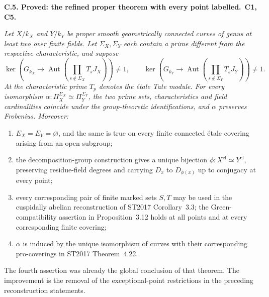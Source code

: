\documentclass[11pt,a4paper]{article}
\newcommand{\cl}{\mathrm{cl}}
\newcommand{\Aut}{\operatorname{Aut}}
\newenvironment{claim}[3]{\par\medskip\noindent\hypertarget{#1}{\textbf{#1. #2.}}\ \textbf{#3.}\par\nopagebreak\smallskip\begingroup\itshape}{\endgroup\par\smallskip}
\begin{document}
\begin{claim}{C.5}{Proved: the refined proper theorem with every point labelled}{C1, C5}
Let $X/k_X$ and $Y/k_Y$ be proper smooth geometrically connected
curves of genus at least two over finite fields. Let $\Sigma_X,
\Sigma_Y$ each contain a prime different from the respective
characteristic, and suppose
\[
 \ker\!\left(G_{k_X}\longrightarrow
       \Aut\!\left(\prod_{s\notin\Sigma_X}T_sJ_X\right)\right)
 \ne1,
 \qquad
 \ker\!\left(G_{k_Y}\longrightarrow
       \Aut\!\left(\prod_{s\notin\Sigma_Y}T_sJ_Y\right)\right)
 \ne1.
\]
At the characteristic prime $T_p$ denotes the \'etale Tate module.
For every isomorphism $\alpha:\Pi_X^{\Sigma_X}\simeq
\Pi_Y^{\Sigma_Y}$, the two prime sets, characteristics and field
cardinalities coincide under the group-theoretic identifications,
and $\alpha$ preserves Frobenius. Moreover:
\begin{enumerate}
\item $E_X=E_Y=\varnothing$, and the same is true on every finite
connected \'etale covering arising from an open subgroup;
\item the decomposition-group construction gives a unique bijection
$\phi:X^{\cl}\simeq Y^{\cl}$, preserving residue-field degrees and
carrying $D_x$ to $D_{\phi(x)}$ up to conjugacy at every point;
\item every corresponding pair of finite marked sets $S,T$ may be
used in the cuspidally abelian reconstruction of ST2017
Corollary~3.3; the Green-compatibility assertion in Proposition~3.12
holds at all points and at every corresponding finite covering;
\item $\alpha$ is induced by the unique isomorphism of curves with
their corresponding pro-coverings in ST2017 Theorem~4.22.
\end{enumerate}
The fourth assertion was already the global conclusion of that
theorem. The improvement is the removal of the exceptional-point
restrictions in the preceding reconstruction statements.
\end{claim}
\end{document}
